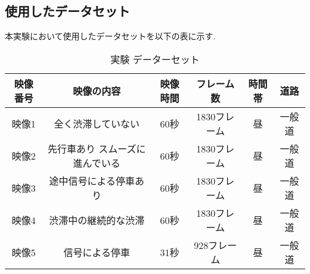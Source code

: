 \subsection{使用したデータセット}
本実験において使用したデータセットを以下の表に示す.

\begin{table}[htbp]
  \centering
  \begin{scriptsize}
  \begin{tabular}{cccccc}
  \toprule
映像番号 & 映像の内容 & 映像時間 & フレーム数 & 時間帯 & 道路 \\
  \midrule
映像1 & 全く渋滞していない & 60秒 & 1830フレーム & 昼 & 一般道 \\
映像2 & 先行車あり スムーズに進んでいる & 60秒 & 1830フレーム & 昼 & 一般道 \\
映像3 & 途中信号による停車あり & 60秒 & 1830フレーム & 昼 & 一般道 \\
映像4 & 渋滞中の継続的な渋滞 & 60秒 & 1830フレーム & 昼 & 一般道 \\
映像5 & 信号による停車 & 31秒& 928フレーム & 昼 & 一般道 \\
  \bottomrule
  \end{tabular}
  \end{scriptsize}
  \caption{実験 データーセット}
  \label{tab:exp_dataset3}
\end{table}

